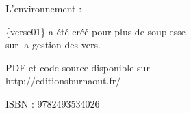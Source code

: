 \documentclass[1pt, onecolumn, oneside, a4paper] {book}
\begin{document}
\medbreak\medbreak
L'environnement  : 

\{verse01\} a été créé pour plus de souplesse\\ sur la gestion des vers.

\medbreak\medbreak
PDF et code source disponible sur \\ 
http://editionsburnaout.fr/

\medbreak\medbreak
ISBN : 9782493534026





\end{document}
